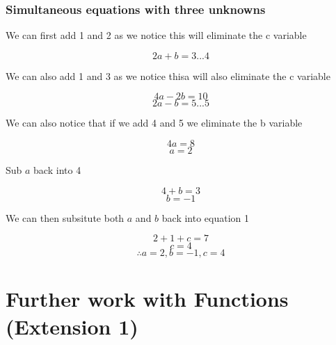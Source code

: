 \documentclass{report}
\begin{document}
\subsubsection{Simultaneous equations with three unknowns}
\begin{center}
    We can first add 1 and 2 as we notice this will eliminate the c variable
\end{center}
$$2a+b=3...4$$
\begin{center}
    We can also add 1 and 3 as we notice thisa will also eliminate the c  variable
\end{center}
$$4a-2b=10$$
$$2a-b=5...5$$
\begin{center}
    We can also notice that if we add 4 and 5 we eliminate the b variable
\end{center}
$$4a=8$$
$$a=2$$
\begin{center}
    Sub $a$ back into 4
\end{center}
$$4+b=3$$
$$b=-1$$
\begin{center}
    We can then subsitute both $a$ and $b$ back into equation 1
\end{center}
$$2+1+c=7$$
$$c=4$$
$$\therefore a =2, b = -1,c =4$$
\newpage
\section{Further work with Functions \textbf{(Extension 1)}}
\end{document}
